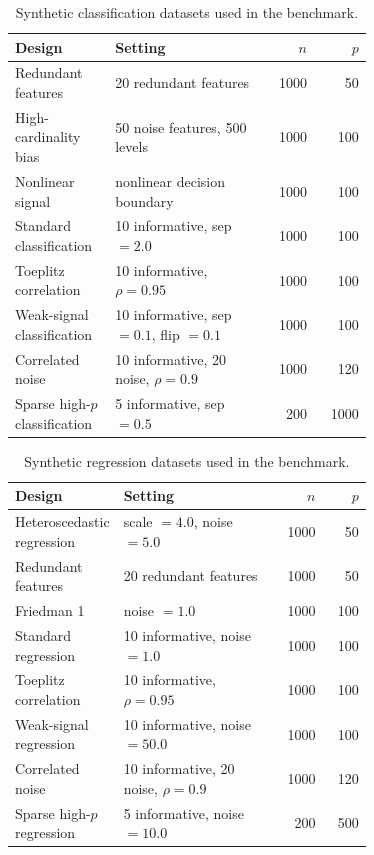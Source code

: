 \begin{table}[H]
  \centering
  \scriptsize
  \setlength{\tabcolsep}{5pt}
  \begin{tabular}{@{}p{0.28\linewidth}p{0.43\linewidth}rr@{}}
    \toprule
    Design & Setting & $n$ & $p$ \\
    \midrule
    Redundant features & 20 redundant features & 1000 & 50 \\
    High-cardinality bias & 50 noise features, 500 levels & 1000 & 100 \\
    Nonlinear signal & nonlinear decision boundary & 1000 & 100 \\
    Standard classification & 10 informative, sep $= 2.0$ & 1000 & 100 \\
    Toeplitz correlation & 10 informative, $\rho = 0.95$ & 1000 & 100 \\
    Weak-signal classification & 10 informative, sep $= 0.1$, flip $= 0.1$ & 1000 & 100 \\
    Correlated noise & 10 informative, 20 noise, $\rho = 0.9$ & 1000 & 120 \\
    Sparse high-$p$ classification & 5 informative, sep $= 0.5$ & 200 & 1000 \\
    \bottomrule
  \end{tabular}
  \caption{Synthetic classification datasets used in the benchmark.}
  \label{tab:synthetic-dataset-inventory-clf}
\end{table}

\begin{table}[H]
  \centering
  \scriptsize
  \setlength{\tabcolsep}{5pt}
  \begin{tabular}{@{}p{0.28\linewidth}p{0.43\linewidth}rr@{}}
    \toprule
    Design & Setting & $n$ & $p$ \\
    \midrule
    Heteroscedastic regression & scale $= 4.0$, noise $= 5.0$ & 1000 & 50 \\
    Redundant features & 20 redundant features & 1000 & 50 \\
    Friedman 1 & noise $= 1.0$ & 1000 & 100 \\
    Standard regression & 10 informative, noise $= 1.0$ & 1000 & 100 \\
    Toeplitz correlation & 10 informative, $\rho = 0.95$ & 1000 & 100 \\
    Weak-signal regression & 10 informative, noise $= 50.0$ & 1000 & 100 \\
    Correlated noise & 10 informative, 20 noise, $\rho = 0.9$ & 1000 & 120 \\
    Sparse high-$p$ regression & 5 informative, noise $= 10.0$ & 200 & 500 \\
    \bottomrule
  \end{tabular}
  \caption{Synthetic regression datasets used in the benchmark.}
  \label{tab:synthetic-dataset-inventory-reg}
\end{table}
